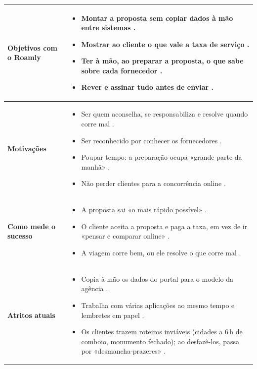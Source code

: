 \begin{table}[H]
\centering\small
\begin{tabularx}{\textwidth}{@{}p{3.2cm}L@{}}
\toprule
\textbf{Objetivos com o Roamly} &
\begin{itemize}[topsep=0pt]
  \item Montar a proposta \textbf{sem copiar dados à mão} entre sistemas .
  \item Mostrar ao cliente \textbf{o que vale a taxa} de serviço .
  \item Ter à mão, ao preparar a proposta, o que sabe sobre cada fornecedor .
  \item Rever e assinar tudo antes de enviar \suposicao{} .
\end{itemize} \\
\midrule
\textbf{Motivações} &
\begin{itemize}[topsep=0pt]
  \item Ser quem aconselha, se responsabiliza e resolve quando corre mal .
  \item Ser reconhecido por conhecer os fornecedores .
  \item Poupar tempo: a preparação ocupa «grande parte da manhã» .
  \item Não perder clientes para a concorrência online .
\end{itemize} \\
\midrule
\textbf{Como mede o sucesso} &
\begin{itemize}[topsep=0pt]
  \item A proposta sai «o mais rápido possível» .
  \item O cliente aceita a proposta e paga a taxa, em vez de ir «pensar e comparar online» .
  \item A viagem corre bem, ou ele resolve o que corre mal .
\end{itemize} \\
\midrule
\textbf{Atritos atuais} &
\begin{itemize}[topsep=0pt]
  \item Copia à mão os dados do portal para o modelo da agência .
  \item Trabalha com várias aplicações ao mesmo tempo e lembretes em papel .
  \item Os clientes trazem roteiros inviáveis (cidades a 6\,h de comboio, monumento fechado); ao desfazê-los, passa por «desmancha-prazeres» .

\end{itemize}
\end{tabularx}
\end{table}
